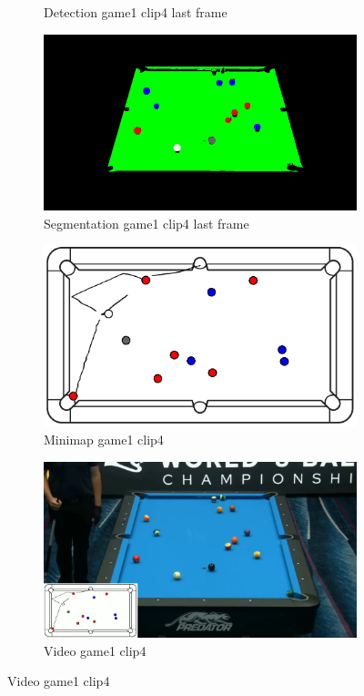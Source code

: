 \begin{figure}[H]
\begin{subfigure}[b]{0.48\textwidth}
		\caption{Detection game1 clip4 last frame}
		\label{fig: game1_clip4_last_frame_detected}
	\end{subfigure}
	\begin{subfigure}[b]{0.48\textwidth}
		\centering
		\includegraphics[width=\textwidth]{images/Segmentation/game1_clip4_segmented_balls_last_frame.jpg}
		\caption{Segmentation game1 clip4 last frame}
		\label{fig: game1_clip4_last_frame_segmented}
	\end{subfigure}
	\begin{subfigure}[b]{0.48\textwidth}
		\centering
		\includegraphics[width=\textwidth]{images/AllMinimap/game1_clip4_minimap.png}
		\caption{Minimap game1 clip4}
		\label{fig: game1_clip4_minimap}
	\end{subfigure}
	\begin{subfigure}[b]{0.48\textwidth}
		\centering
		\includegraphics[width=\textwidth]{images/Video/game1_clip4_video.jpg}
		\caption{Video game1 clip4}
		\label{fig: game1_clip4_video}
	\end{subfigure}


\end{figure}
